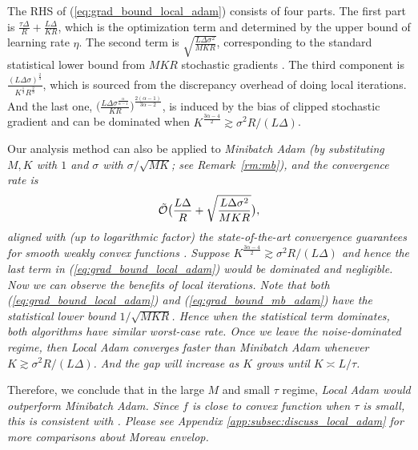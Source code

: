 \documentclass{article} %
\numberwithin{equation}{section}
\renewcommand{\eqref}[1]{(\ref{#1})}
\begin{document}
The RHS of \eqref{eq:grad_bound_local_adam} consists of four parts.
The first part is $\frac{\tau\Delta}{R} + \frac{L\Delta}{KR}$, which is the optimization term and determined by the upper bound of learning rate $\eta$.
The second term is $\sqrt{\frac{L\Delta\sigma^2}{MKR}}$, corresponding to the standard statistical lower bound from $MKR$ stochastic gradients \citep{arjevani2023lower}.
The third component is $\frac{(L\Delta\sigma)^{\frac{2}{3}}}{K^{\frac{1}{3}}R^{\frac{2}{3}}}$, which is sourced from the discrepancy overhead of doing local iterations.
And the last one, $\Big(\frac{L\Delta\sigma^{\frac{\alpha}{\alpha-1}}}{KR}\Big)^{\frac{2(\alpha-1)}{3\alpha-2}}$, is induced by the bias of clipped stochastic gradient and can be dominated when $K^{\frac{3\alpha-4}{2}}\gtrsim \sigma^2R/(L\Delta)$. 

Our analysis method can also be applied to \em Minibatch \em Adam (by substituting $M,K$ with $1$ and $\sigma$ with $\sigma/\sqrt{MK}$; see Remark~\ref{rm:mb}), and the convergence rate is 
\begin{equation}\label{eq:grad_bound_mb_adam}
    \Tilde{\mathcal{O}}\big(
        \frac{L\Delta}{R} + \sqrt{\frac{L\Delta\sigma^2}{MKR}}\big),
\end{equation}
aligned with (up to logarithmic factor) the state-of-the-art convergence guarantees for smooth weakly convex functions \citep{davis2019stochastic, deng2021minibatch}.  
Suppose $K^{\frac{3\alpha-4}{2}}\gtrsim  \sigma^2R/(L\Delta)$ and hence the last term in \eqref{eq:grad_bound_local_adam} would be dominated and negligible.
Now we can observe the benefits of local iterations. 
Note that both \eqref{eq:grad_bound_local_adam} and \eqref{eq:grad_bound_mb_adam} have the statistical lower bound $1/\sqrt{MKR}$.
Hence when the statistical term dominates, both algorithms have similar worst-case rate.
Once we leave the noise-dominated regime, then \em Local \em Adam converges faster than \em Minibatch \em Adam whenever $K\gtrsim \sigma^2R/(L\Delta)$.
And the gap will increase as $K$ grows until $K\asymp L/\tau$.

Therefore, we conclude that in the large $M$ and small $\tau$ regime, \em Local \em Adam would outperform \em Minibatch \em Adam. 
Since $f$ is close to convex function when $\tau$ is small, this  is consistent with \citet{woodworth2020local}. Please see Appendix \ref{app:subsec:discuss_local_adam} for more comparisons about Moreau envelop.
\end{document}
